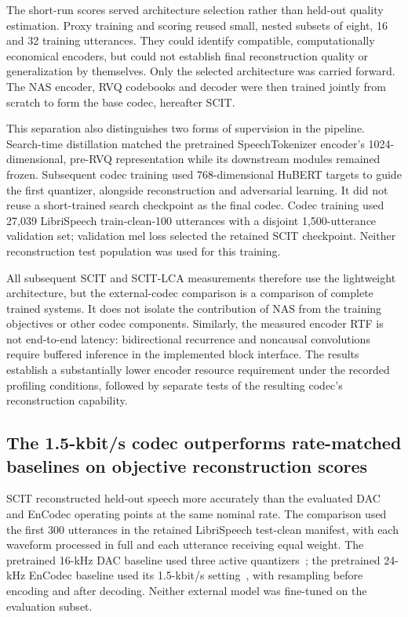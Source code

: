 The short-run scores served architecture selection rather than held-out quality estimation. Proxy training and scoring reused small, nested subsets of eight, 16 and 32 training utterances. They could identify compatible, computationally economical encoders, but could not establish final reconstruction quality or generalization by themselves. Only the selected architecture was carried forward. The NAS encoder, RVQ codebooks and decoder were then trained jointly from scratch to form the base codec, hereafter SCIT.

This separation also distinguishes two forms of supervision in the pipeline. Search-time distillation matched the pretrained SpeechTokenizer encoder's 1024-dimensional, pre-RVQ representation while its downstream modules remained frozen. Subsequent codec training used 768-dimensional HuBERT targets to guide the first quantizer, alongside reconstruction and adversarial learning. It did not reuse a short-trained search checkpoint as the final codec. Codec training used 27,039 LibriSpeech train-clean-100 utterances with a disjoint 1,500-utterance validation set; validation mel loss selected the retained SCIT checkpoint. Neither reconstruction test population was used for this training.

All subsequent SCIT and SCIT-LCA measurements therefore use the lightweight architecture, but the external-codec comparison is a comparison of complete trained systems. It does not isolate the contribution of NAS from the training objectives or other codec components. Similarly, the measured encoder RTF is not end-to-end latency: bidirectional recurrence and noncausal convolutions require buffered inference in the implemented block interface. The results establish a substantially lower encoder resource requirement under the recorded profiling conditions, followed by separate tests of the resulting codec's reconstruction capability.

\subsection{The 1.5-kbit/s codec outperforms rate-matched baselines on objective reconstruction scores}
\label{sec:rv2-quality}
SCIT reconstructed held-out speech more accurately than the evaluated DAC and EnCodec operating points at the same nominal rate. The comparison used the first 300 utterances in the retained LibriSpeech test-clean manifest, with each waveform processed in full and each utterance receiving equal weight. The pretrained 16-kHz DAC baseline used three active quantizers~\cite{dac}; the pretrained 24-kHz EnCodec baseline used its 1.5-kbit/s setting~\cite{encodec}, with resampling before encoding and after decoding. Neither external model was fine-tuned on the evaluation subset.

